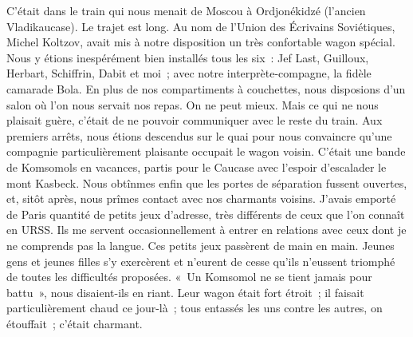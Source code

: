\documentclass[twoside]{book} %
\newcommand{\astermono}{\medskip\centerline{\color{rubric}\large\selectfont{\syms ✻}}\medskip\par}%
\begin{document}
\astermono

\noindent C’était dans le train qui nous menait de Moscou à Ordjonékidzé (l’ancien Vladikaucase). Le trajet est long. Au nom de l’Union des Écrivains Soviétiques, Michel Koltzov, avait mis à notre disposition un très confortable wagon spécial. Nous y étions inespérément bien installés tous les six : Jef Last, Guilloux, Herbart, Schiffrin, Dabit et moi ; avec notre interprète-compagne, la fidèle camarade Bola. En plus de nos compartiments à couchettes, nous disposions d’un salon où l’on nous servait nos repas. On ne peut mieux. Mais ce qui ne nous plaisait guère, c’était de ne pouvoir communiquer avec le reste du train. Aux premiers arrêts, nous étions descendus sur le quai pour nous convaincre qu’une compagnie particulièrement plaisante occupait le wagon voisin. C’était une bande de Komsomols en vacances, partis pour le Caucase avec l’espoir d’escalader le mont Kasbeck. Nous obtînmes enfin que les portes de séparation fussent ouvertes, et, sitôt après, nous prîmes contact avec nos charmants voisins. J’avais emporté de Paris quantité de petits jeux d’adresse, très différents de ceux que l’on connaît en URSS. Ils me servent occasionnellement à entrer en relations avec ceux dont je ne comprends pas la langue. Ces petits jeux passèrent de main en main. Jeunes gens et jeunes filles s’y exercèrent et n’eurent de cesse qu’ils n’eussent triomphé de toutes les difficultés proposées. « Un Komsomol ne se tient jamais pour battu », nous disaient-ils en riant. Leur wagon était fort étroit ; il faisait particulièrement chaud ce jour-là ; tous entassés les uns contre les autres, on étouffait ; c’était charmant.\par
\end{document}
